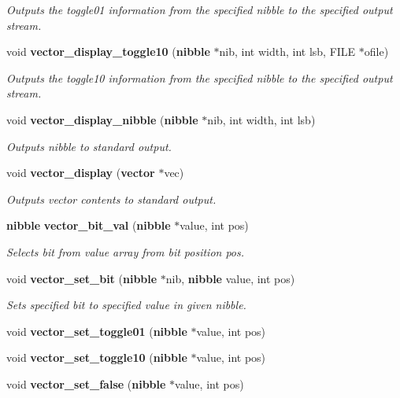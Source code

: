 \begin{CompactItemize}
\begin{CompactList}\small\item\em Outputs the toggle01 information from the specified nibble to the specified output stream. \item\end{CompactList}\item 
void {\bf vector\_\-display\_\-toggle10} ({\bf nibble} $\ast$nib, int width, int lsb, FILE $\ast$ofile)
\begin{CompactList}\small\item\em Outputs the toggle10 information from the specified nibble to the specified output stream. \item\end{CompactList}\item 
void {\bf vector\_\-display\_\-nibble} ({\bf nibble} $\ast$nib, int width, int lsb)
\begin{CompactList}\small\item\em Outputs nibble to standard output. \item\end{CompactList}\item 
void {\bf vector\_\-display} ({\bf vector} $\ast$vec)
\begin{CompactList}\small\item\em Outputs vector contents to standard output. \item\end{CompactList}\item 
{\bf nibble} {\bf vector\_\-bit\_\-val} ({\bf nibble} $\ast$value, int pos)
\begin{CompactList}\small\item\em Selects bit from value array from bit position pos. \item\end{CompactList}\item 
void {\bf vector\_\-set\_\-bit} ({\bf nibble} $\ast$nib, {\bf nibble} value, int pos)
\begin{CompactList}\small\item\em Sets specified bit to specified value in given nibble. \item\end{CompactList}\item 
void {\bf vector\_\-set\_\-toggle01} ({\bf nibble} $\ast$value, int pos)
\item 
void {\bf vector\_\-set\_\-toggle10} ({\bf nibble} $\ast$value, int pos)
\item 
void {\bf vector\_\-set\_\-false} ({\bf nibble} $\ast$value, int pos)

\end{CompactItemize}
